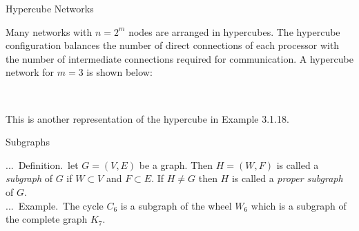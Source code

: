 \documentclass[smaller,hyperref={CJKbookmarks=true}]{beamer}
\newcounter{zhuo}[subsection]
\renewcommand{\thezhuo}{\thesection.\thesubsection.\arabic{zhuo}}
\newenvironment{DEFINITION}{\stepcounter{zhuo}\alert{\thezhuo.~Definition.\,}}{}
\newenvironment{EXAMPLE}{\stepcounter{zhuo}\alert{\!\thezhuo.~Example.\,}}{}
\begin{document}
\begin{frame}[c]{Hypercube Networks}
\begin{spacing}{1.15}
Many networks with $n=2^m$ nodes are arranged in hypercubes. The
hypercube configuration balances the number of direct connections of each
processor with the number of intermediate connections required for
communication. A hypercube network for $m=3$ is shown below:\\[10pt]
\begin{center}
\\[7pt]
\end{center}
This is another representation of the hypercube in Example 3.1.18.
\end{spacing}
\end{frame}
\begin{frame}[c]{Subgraphs}
\begin{spacing}{1.2}
\begin{DEFINITION}
let $G=(V,E)$ be a graph. Then $H=(W,F)$ is called a \emph{subgraph} of $G$ if $W\subset V$ and $F\subset E$. If $H\neq G$ then $H$ is called a \emph{proper subgraph} of $G$.\\[7pt]
\begin{EXAMPLE}
The cycle $C_6$ is a subgraph of the wheel $W_6$ which is a subgraph of the complete graph $K_7$.
\end{EXAMPLE}
\end{DEFINITION}
\end{spacing}
\end{frame}
\end{document}
